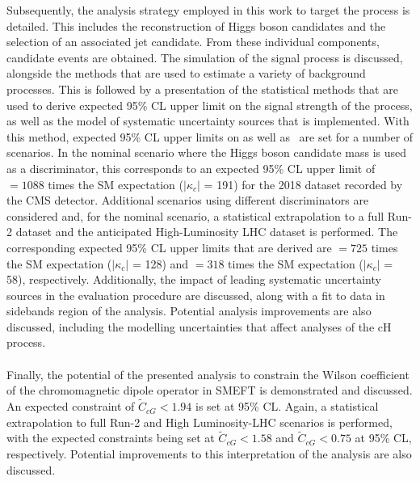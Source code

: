 Subsequently, the analysis strategy employed in this work to target the \cHZZsen process is detailed. This includes the reconstruction of Higgs boson candidates and the selection of an associated jet candidate. From these individual components, candidate \cHZZ events are obtained. The simulation of the \cHZZsen signal process is discussed, alongside the methods that are used to estimate a variety of background processes. This is followed by a presentation of the statistical methods that are used to derive expected 95\% CL upper limit on the signal strength of the \cHZZsen process, as well as the model of systematic uncertainty sources that is implemented. With this method, expected 95\% CL upper limits on \sBR as well as \kappac\, are set for a number of scenarios. In the nominal scenario where the Higgs boson candidate mass is used as a discriminator, this corresponds to an expected 95\% CL upper limit of \sBR$= 1088$ times the SM expectation ($\mid$$\kappa_c$$\mid$ = 191) for the 2018 dataset recorded by the CMS detector. Additional scenarios using different discriminators are considered and, for the nominal scenario, a statistical extrapolation to a full Run-2 dataset and the anticipated High-Luminosity LHC dataset is performed. The corresponding expected 95\% CL upper limits that are derived are \sBR$ = 725$ times the SM expectation ($\mid$$\kappa_c$$\mid$ = 128) and \sBR$ = 318$ times the SM expectation ($\mid$$\kappa_c$$\mid$ = 58), respectively. Additionally, the impact of leading systematic uncertainty sources in the evaluation procedure are discussed, along with a fit to data in sidebands region of the analysis. Potential analysis improvements are also discussed, including the modelling uncertainties that affect analyses of the cH process. \\
\\
Finally, the potential of the presented analysis to constrain the Wilson coefficient of the chromomagnetic dipole operator in SMEFT is demonstrated and discussed. An expected constraint of $\tilde{C}_{cG} < 1.94$ is set at 95\% CL. Again, a statistical extrapolation to full Run-2 and High Luminosity-LHC scenarios is performed, with the expected constraints being set at $\tilde{C}_{cG} < 1.58$ and $\tilde{C}_{cG} < 0.75$ at 95\% CL, respectively. Potential improvements to this interpretation of the analysis are also discussed. \\
\\

